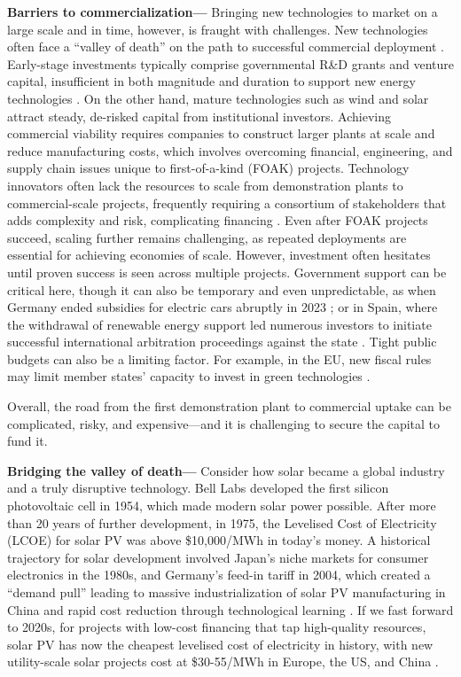 \documentclass[pdflatex,sn-basic, Numbered]{sn-jnl}
\theoremstyle{thmstyleone}%
\theoremstyle{thmstyletwo}%
\theoremstyle{thmstylethree}%
\begin{document}
\textbf{Barriers to commercialization---} Bringing new technologies to market on a large scale and in time, however, is fraught with challenges.
New technologies often face a \enquote{valley of death} on the path to successful commercial deployment \cite{google-advancedtech}.
Early-stage investments typically comprise governmental R\&D grants and venture capital, insufficient in both magnitude and duration to support new energy technologies \cite{khatcherianBarriersTimelyDeployment2022}. On the other hand, mature technologies such as wind and solar attract steady, de-risked capital from institutional investors.
Achieving commercial viability requires companies to construct larger plants at scale and reduce manufacturing costs, which involves overcoming financial, engineering, and supply chain issues unique to first-of-a-kind (FOAK) projects. Technology innovators often lack the resources to scale from demonstration plants to commercial-scale projects, frequently requiring a consortium of stakeholders that adds complexity and risk, complicating financing \cite{google-advancedtech}.
Even after FOAK projects succeed, scaling further remains challenging, as repeated deployments are essential for achieving economies of scale. However, investment often hesitates until proven success is seen across multiple projects. Government support can be critical here, though it can also be temporary and even unpredictable, as when Germany ended subsidies for electric cars abruptly in 2023 \cite{amelangAbruptEndGerman2023}; or in Spain, where the withdrawal of renewable energy support led numerous investors to initiate successful international arbitration proceedings against the state \cite{gurtlerDismantlingRenewableEnergy2019}. Tight public budgets can also be a limiting factor. For example, in the EU, new fiscal rules may limit member states' capacity to invest in green technologies \cite{darvasImplicationsEuropeanUnions2024}.

Overall, the road from the first demonstration plant to commercial uptake can be complicated, risky, and expensive---and it is challenging to secure the capital to fund it.

\textbf{Bridging the valley of death---} Consider how solar became a global industry and a truly disruptive technology. Bell Labs developed the first silicon photovoltaic cell in 1954, which made modern solar power possible. After more than 20 years of further development, in 1975, the Levelised Cost of Electricity (LCOE) for solar PV was above \$10,000/MWh in today's money. A historical trajectory for solar development involved Japan's niche markets for consumer electronics in the 1980s, and Germany's feed-in tariff in 2004, which created a \enquote{demand pull} leading to massive industrialization of solar PV manufacturing in China and rapid cost reduction through technological learning \cite{nemetHowSolarEnergy2019}. If we fast forward to 2020s, for projects with low-cost financing that tap high-quality resources, solar PV has now the cheapest levelised cost of electricity in history, with new utility-scale solar projects cost at \$30-55/MWh in Europe, the US, and China \cite{ieaWorldEnergyOutlook2024}.
\end{document}
